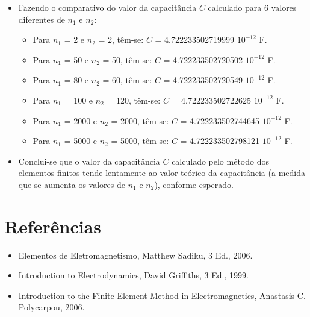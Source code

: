 \documentclass[10pt]{article}
\begin{document}
\begin{itemize}
    \item Fazendo o comparativo do valor da capacitância $C$ calculado para 6 valores diferentes de $n_{1}$ e $n_{2}$:
    \begin{itemize}
        \item Para $n_{1}$ = 2 e $n_{2}$ = 2, têm-se: $C$ = 4.722233502719999 \cdot $10^{-12}$ F.
        \item Para $n_{1}$ = 50 e $n_{2}$ = 50, têm-se: $C$ = 4.722233502720502 \cdot $10^{-12}$ F.
        \item Para $n_{1}$ = 80 e $n_{2}$ = 60, têm-se: $C$ = 4.722233502720549 \cdot $10^{-12}$ F.
        \item Para $n_{1}$ = 100 e $n_{2}$ = 120, têm-se: $C$ = 4.722233502722625 \cdot $10^{-12}$ F.
        \item Para $n_{1}$ = 2000 e $n_{2}$ = 2000, têm-se: $C$ = 4.722233502744645 \cdot $10^{-12}$ F.
        \item Para $n_{1}$ = 5000 e $n_{2}$ = 5000, têm-se: $C$ = 4.722233502798121 \cdot $10^{-12}$ F.
    \end{itemize}
    \item Conclui-se que o valor da capacitância $C$ calculado pelo método dos elementos finitos tende lentamente ao valor teórico da capacitância (a medida que se aumenta os valores de $n_{1}$ e $n_{2}$), conforme esperado.
    
    
    \end{itemize}

\section{Referências}
    \begin{itemize}
    \item Elementos de Eletromagnetismo, Matthew Sadiku, 3 Ed., 2006.
    \item Introduction to Electrodynamics, David Griffiths, 3 Ed., 1999.
    \item Introduction to the Finite Element Method in Electromagnetics, Anastasis C. Polycarpou, 2006.
    \end{itemize}
    
\end{document}
